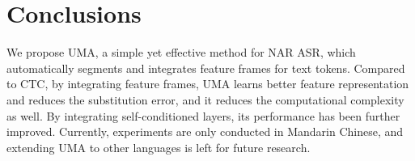 \documentclass{article}
\begin{document}
 \section{Conclusions}
\label{sec:conclusion}

We propose UMA, a simple yet effective method for NAR ASR, which automatically segments and integrates feature frames for text tokens. Compared to CTC, by integrating feature frames, UMA learns better feature representation and reduces the substitution error, and it reduces the computational complexity as well. By integrating self-conditioned layers, its performance has been further improved. Currently, experiments are only conducted in Mandarin Chinese, and extending UMA to other languages is left for future research.
 


\vfill\pagebreak
\end{document}
